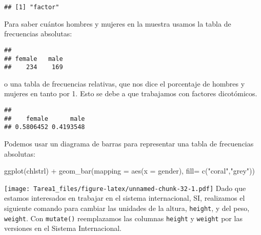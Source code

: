 \documentclass[
]{article}
\newenvironment{Shaded}{\begin{snugshade}}{\end{snugshade}}
\newcommand{\AttributeTok}[1]{\textcolor[rgb]{0.77,0.63,0.00}{#1}}
\newcommand{\FunctionTok}[1]{\textcolor[rgb]{0.00,0.00,0.00}{#1}}
\newcommand{\NormalTok}[1]{#1}
\newcommand{\SpecialCharTok}[1]{\textcolor[rgb]{0.00,0.00,0.00}{#1}}
\newcommand{\StringTok}[1]{\textcolor[rgb]{0.31,0.60,0.02}{#1}}
\begin{document}
\begin{verbatim}
## [1] "factor"
\end{verbatim}

Para saber cuántos hombres y mujeres en la muestra usamos la tabla de
frecuencias absolutas:

\begin{Shaded}
\end{Shaded}

\begin{verbatim}
## 
## female   male 
##    234    169
\end{verbatim}

o una tabla de frecuencias relativas, que nos dice el porcentaje de
hombres y mujeres en tanto por 1. Esto se debe a que trabajamos con
factores dicotómicos.

\begin{Shaded}
\end{Shaded}

\begin{verbatim}
## 
##    female      male 
## 0.5806452 0.4193548
\end{verbatim}

Podemos usar un diagrama de barras para representar una tabla de
frecuencias absolutas:

\begin{Shaded}
\begin{Highlighting}[]
\FunctionTok{ggplot}\NormalTok{(chlstrl) }\SpecialCharTok{+}
  \FunctionTok{geom\_bar}\NormalTok{(}\AttributeTok{mapping =} \FunctionTok{aes}\NormalTok{(}\AttributeTok{x =}\NormalTok{ gender), }\AttributeTok{fill=} \FunctionTok{c}\NormalTok{(}\StringTok{"coral"}\NormalTok{,}\StringTok{"grey"}\NormalTok{))}
\end{Highlighting}
\end{Shaded}

\texttt{[image: Tarea1\_files/figure-latex/unnamed-chunk-32-1.pdf]} Dado
que estamos interesados en trabajar en el sistema internacional, SI,
realizamos el siguiente comando para cambiar las unidades de la altura,
\texttt{height}, y del peso, \texttt{weight}. Con \texttt{mutate()}
reemplazamos las columnas \texttt{height} y \texttt{weight} por las
versiones en el Sistema Internacional.
\end{document}

